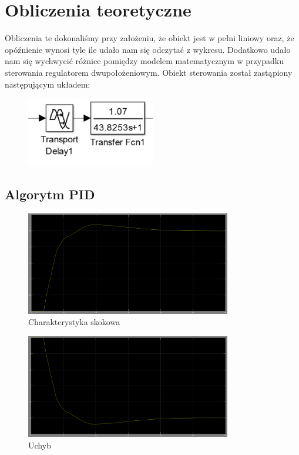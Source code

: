 \documentclass[a4paper]{article}
\begin{document}
	\section{Obliczenia teoretyczne}
		Obliczenia te dokonaliśmy przy założeniu, że obiekt jest w pełni liniowy oraz, że opóźnienie wynosi tyle ile udało nam się odczytać z wykresu. Dodatkowo udało nam się wychwycić różnice pomiędzy modelem matematycznym w przypadku sterowania regulatorem dwupołożeniowym. Obiekt sterowania został zastąpiony następującym układem:
		\begin{figure}[H]
			\centering
			\includegraphics[width=0.5\textwidth]{./img/obiekt.png}
		\end{figure}
		\subsection{Algorytm PID}
			\begin{figure}[H]
				\centering
				\caption{Charakterystyka skokowa}
				\includegraphics[width=0.8\textwidth]{./img/PID_step.png}
			\end{figure}
			\begin{figure}[H]
				\centering
				\caption{Uchyb}
				\includegraphics[width=0.8\textwidth]{./img/PID_error_correct.png}
			\end{figure}
\end{document}
